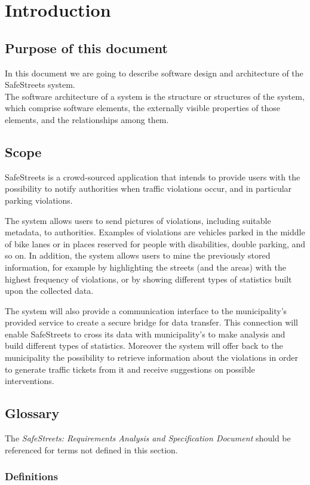\section{Introduction}
\subsection{Purpose of this document}
In this document we are going to describe software design and architecture of the SafeStreets system.\\
The software architecture of a system is the structure or structures of the system, which comprise software elements, the externally visible properties of those elements, and the relationships among them.\cite{SoftwareArch}

\subsection{Scope}
SafeStreets is a crowd-­sourced application that intends to provide users with the possibility to notify authorities when traffic violations occur, and in particular parking violations. 
	
	The system allows users to send pictures of violations, including suitable metadata, to authorities. Examples of violations are vehicles parked in the middle of bike lanes or in places reserved for people with disabilities, double parking, and so on. In addition, the system allows users to mine the previously stored information, for example by highlighting the streets (and the areas) with the highest frequency of violations, or by showing different types of statistics built upon the collected data.
	
	The system will also provide a communication interface to the municipality's provided service to create a secure bridge for data transfer. This connection will enable SafeStreets to cross its data with municipality's to make analysis and build different types of statistics. Moreover the system will offer back to the municipality the possibility to retrieve information about the violations in order to generate traffic tickets from it and receive suggestions on possible interventions.\cite{Assignments}
\subsection{Glossary}
The \emph{SafeStreets: Requirements Analysis and Specification Document}\cite{RASD} should be referenced for terms not defined in this section.
\subsubsection{Definitions}
	

